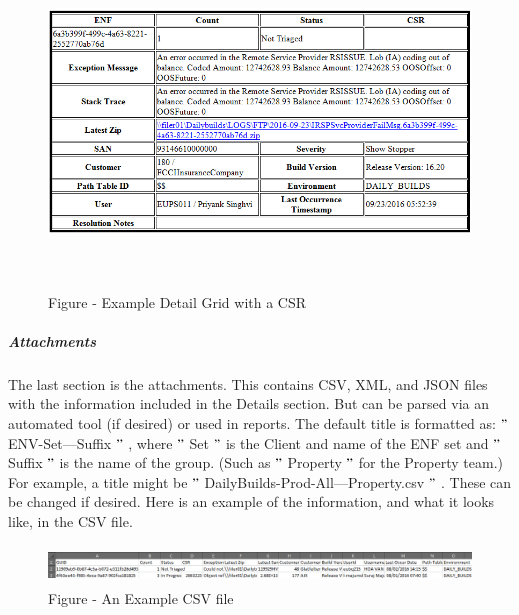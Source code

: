 \documentclass[a4paper,12pt]{report}
\begin{document}
\begin{figure}[H]
\begin{center}
\includegraphics[width=6.5in,height=3.47in]{./uploads_new/ENF_Alert_Emails.docx_DIR/media/image5.png}
\end{center}
\caption{Figure  - Example Detail Grid with a CSR}
\end{figure}




\vspace{12pt}
 \par
\vspace{12pt}
\subparagraph*{Attachments}
 \par
\vspace{12pt}
The last section is the attachments. This contains CSV, XML, and JSON files with the information included in the Details section. But can be parsed via an automated tool (if desired) or used in reports. The default title is formatted as:  $ " $ ENV-Set---Suffix $ " $ , where  $ " $ Set $ " $  is the Client and name of the ENF set and  $ " $ Suffix $ " $  is the name of the group. (Such as  $ " $ Property $ " $  for the Property team.) For example, a title might be  $ " $ DailyBuilds-Prod-All---Property.csv $ " $ . These can be changed if desired. Here is an example of the information, and what it looks like, in the CSV file. \par




\begin{figure}[H]
\begin{center}
\includegraphics[width=6.5in,height=0.4in]{./uploads_new/ENF_Alert_Emails.docx_DIR/media/image6.png}
\end{center}
\caption{Figure  - An Example CSV file}
\end{figure}
\end{document}
